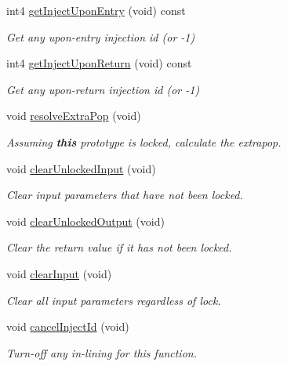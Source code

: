 \begin{DoxyCompactItemize}
int4 \mbox{\hyperlink{class_func_proto_aa68fc3fa0f616ed233026bcb415a1143}{get\+Inject\+Upon\+Entry}} (void) const
\begin{DoxyCompactList}\small\item\em Get any {\itshape upon-\/entry} injection id (or -\/1) \end{DoxyCompactList}\item 
int4 \mbox{\hyperlink{class_func_proto_a3c835c084a2714801d06d68631aa52ec}{get\+Inject\+Upon\+Return}} (void) const
\begin{DoxyCompactList}\small\item\em Get any {\itshape upon-\/return} injection id (or -\/1) \end{DoxyCompactList}\item 
void \mbox{\hyperlink{class_func_proto_a22889d3a526dce245368b8de9c889529}{resolve\+Extra\+Pop}} (void)
\begin{DoxyCompactList}\small\item\em Assuming {\bfseries{this}} prototype is locked, calculate the {\itshape extrapop}. \end{DoxyCompactList}\item 
void \mbox{\hyperlink{class_func_proto_ae91eb49088323b42bdb38b83586eea6f}{clear\+Unlocked\+Input}} (void)
\begin{DoxyCompactList}\small\item\em Clear input parameters that have not been locked. \end{DoxyCompactList}\item 
void \mbox{\hyperlink{class_func_proto_a3c7428f70c6c7e040b4d090f3efeee08}{clear\+Unlocked\+Output}} (void)
\begin{DoxyCompactList}\small\item\em Clear the return value if it has not been locked. \end{DoxyCompactList}\item 
void \mbox{\hyperlink{class_func_proto_af8059930e66577c8906ade2f36f65cce}{clear\+Input}} (void)
\begin{DoxyCompactList}\small\item\em Clear all input parameters regardless of lock. \end{DoxyCompactList}\item 
void \mbox{\hyperlink{class_func_proto_a0bb585835251e43a5c9f644519e69dc0}{cancel\+Inject\+Id}} (void)
\begin{DoxyCompactList}\small\item\em Turn-\/off any in-\/lining for this function. \end{DoxyCompactList}\item 

\end{DoxyCompactItemize}
